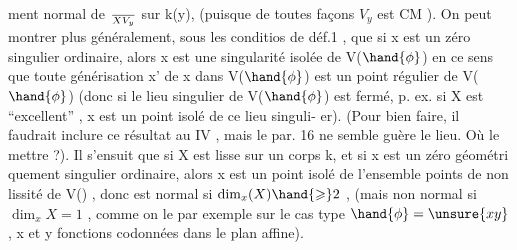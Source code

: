 
ment normal de $\over{X}{V}_y$ sur k(y), (puisque de toutes façons   $V_y$ est CM ).
On peut montrer  plus généralement, sous les conditios de déf.1 , que si
x est un zéro singulier ordinaire, alors x est une singularité isolée
de V($\hand{\phi}$)  en ce sens que toute générisation  x' de x dans V($\hand{\phi}$) est un
point régulier de V($\hand{\phi}$)  (donc si le lieu singulier de V($\hand{\phi}$) est fermé, p.
ex. si X est ``excellent'' , x est  un point isolé de ce lieu singuli-%
er).  (Pour bien faire, il faudrait inclure ce résultat au 
IV , mais  le par. 16 ne semble guère le lieu. Où le mettre ?).  Il
s'ensuit que si X est lisse sur un corps k, et si x est un zéro géométri%
quement singulier ordinaire, alors  x est un point isolé de l'ensemble
 points de non lissité  de V() , donc est  normal si  $\dim_x(X) \hand{\geqslant} 2$ ,
(mais  non normal si $\dim_x X = 1$ , comme on le   par exemple sur
le cas type $\hand{\phi} = \unsure{xy}$ , x et y fonctions codonnées dans le plan affine).



